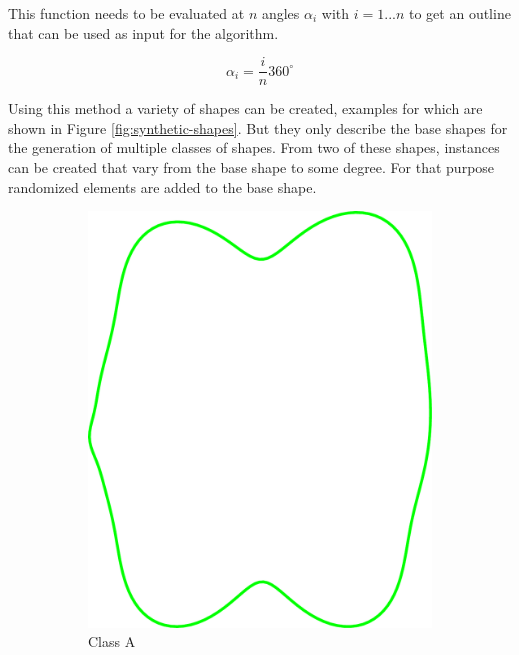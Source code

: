 \documentclass[pdftex,12pt,a4paper]{report}
\begin{document}
This function needs to be evaluated at $n$ angles $\alpha_i$ with $i = 1 ... n$ to get an outline that can be used as input for the algorithm.

\begin{equation}
	\alpha_i = \frac{i}{n} 360^{\circ}
\end{equation}

Using this method a variety of shapes can be created, examples for which are shown in Figure \ref{fig:synthetic-shapes}. But they only describe the base shapes for the generation of multiple classes of shapes. From two of these shapes, instances can be created that vary from the base shape to some degree. For that purpose randomized elements are added to the base shape.

\begin{figure}
	\centering
	\begin{subfigure}[b]{0.24\textwidth}
		\centering
		\includegraphics[width=.9\linewidth]{img/synthetic-generation/classes/1-1.pdf}
		\caption{Class A}
		\label{subfig:synthetic-classes:a-1}
	\end{subfigure}
	\begin{subfigure}[b]{0.24\textwidth}
		\centering

\end{subfigure}
\end{figure}
\end{document}
